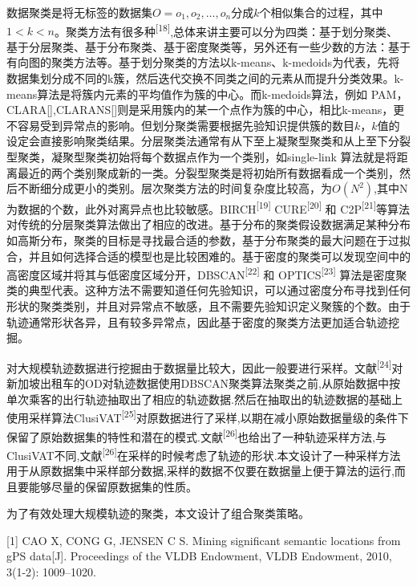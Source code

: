 \documentclass[]{article}
\begin{document}
数据聚类是将无标签的数据集\(O={o_1,o_2,\ldots,o_n}\)分成\(k\)个相似集合的过程，其中\(1<{k}<{n}\)。聚类方法有很多种\textsuperscript{{[}18{]}},总体来讲主要可以分为四类：基于划分聚类、
基于分层聚类、基于分布聚类、基于密度聚类等，另外还有一些少数的方法：基于有向图的聚类方法等。基于划分聚类的方法以k-means、k-medoids为代表，先将数据集划分成不同的k簇，然后迭代交换不同类之间的元素从而提升分类效果。k-means算法是将簇内元素的平均值作为簇的中心。而k-medoids算法，例如
PAM，CLARA{[}{]},CLARANS{[}{]}则是采用簇内的某一个点作为簇的中心，相比k-means，更不容易受到异常点的影响。但划分聚类需要根据先验知识提供簇的数目\(k\)，\(k\)值的设定会直接影响聚类结果。分层聚类法通常有从下至上凝聚型聚类和从上至下分裂型聚类，凝聚型聚类初始将每个数据点作为一个类别，如single-link
算法就是将距离最近的两个类别聚成新的一类。分裂型聚类是将初始所有数据看成一个类别，然后不断细分成更小的类别。层次聚类方法的时间复杂度比较高，为\(O(N^2)\),其中N为数据的个数，此外对离异点也比较敏感。BIRCH\textsuperscript{{[}19{]}}
CURE\textsuperscript{{[}20{]}} 和
C2P\textsuperscript{{[}21{]}}等算法对传统的分层聚类算法做出了相应的改进。基于分布的聚类假设数据满足某种分布如高斯分布，聚类的目标是寻找最合适的参数，基于分布聚类的最大问题在于过拟合，并且如何选择合适的模型也是比较困难的。基于密度的聚类可以发现空间中的高密度区域并将其与低密度区域分开，DBSCAN\textsuperscript{{[}22{]}}
和 OPTICS\textsuperscript{{[}23{]}}
算法是密度聚类的典型代表。这种方法不需要知道任何先验知识，可以通过密度分布寻找到任何形状的聚类类别，并且对异常点不敏感，且不需要先验知识定义聚簇的个数。由于轨迹通常形状各异，且有较多异常点，因此基于密度的聚类方法更加适合轨迹挖掘。

对大规模轨迹数据进行挖掘由于数据量比较大，因此一般要进行采样。文献\textsuperscript{{[}24{]}}对新加坡出租车的OD对轨迹数据使用DBSCAN聚类算法聚类之前,从原始数据中按单次乘客的出行轨迹抽取出了相应的轨迹数据.然后在抽取出的轨迹数据的基础上使用采样算法ClusiVAT\textsuperscript{{[}25{]}}对原数据进行了采样,以期在减小原始数据量级的条件下保留了原始数据集的特性和潜在的模式.文献\textsuperscript{{[}26{]}}也给出了一种轨迹采样方法,与ClusiVAT不同,文献\textsuperscript{{[}26{]}}在采样的时候考虑了轨迹的形状.本文设计了一种采样方法用于从原数据集中采样部分数据,采样的数据不仅要在数据量上便于算法的运行,而且要能够尽量的保留原数据集的性质。

为了有效处理大规模轨迹的聚类，本文设计了组合聚类策略。

\hypertarget{refs}{}
\hypertarget{ref-cao2010mining}{}
{[}1{]} CAO X, CONG G, JENSEN C S. Mining significant semantic locations
from gPS data{[}J{]}. Proceedings of the VLDB Endowment, VLDB Endowment,
2010, 3(1-2): 1009--1020.
\end{document}
